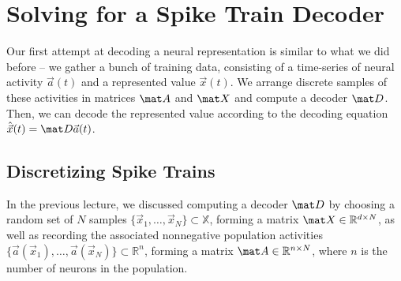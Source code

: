 \documentclass[10pt,letterpaper,oneside]{article}
\begin{document}
\section{Solving for a Spike Train Decoder}

Our first attempt at decoding a neural representation is similar to what we did before -- we gather a bunch of training data, consisting of a time-series of neural activity $\vec a(t)$ and a represented value $\vec x(t)$. We arrange discrete samples of these activities in matrices $\mat A$ and $\mat X$ and compute a decoder $\mat D$. Then, we can decode the represented value according to the decoding equation $\hat{\vec x}(t) = \mat D \vec a(t)$.


\subsection{Discretizing Spike Trains}

In the previous lecture, we discussed computing a decoder $\mat D$ by choosing a random set of $N$ samples $\big\{ \vec x_1, \ldots, \vec x_N \big\} \subset \mathbb{X}$, forming a matrix $\mat X \in \mathbb{R}^{d \times N}$, as well as recording the associated nonnegative population activities $\big\{ \vec a(\vec x_1), \ldots, \vec a(\vec x_N) \big\} \subset \mathbb{R}^n$, forming a matrix $\mat A \in \mathbb{R}^{n \times N}$, where $n$ is the number of neurons in the population.
\end{document}
